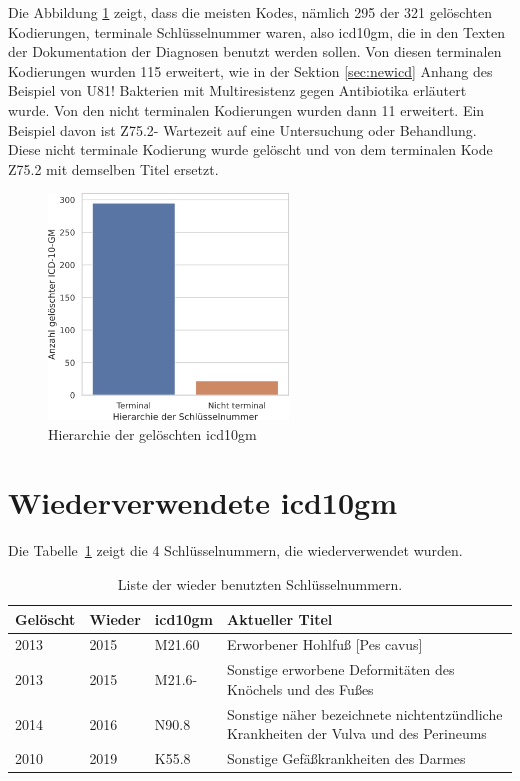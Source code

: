 Die Abbildung \ref{fig:oldicdort} zeigt, dass die meisten Kodes, nämlich 295 der 321 gelöschten Kodierungen, terminale Schlüsselnummer waren, also \ac{icd10gm}, die in den Texten der Dokumentation der Diagnosen benutzt werden sollen. Von diesen terminalen Kodierungen wurden 115 erweitert, wie in der Sektion \ref{sec:newicd} Anhang des Beispiel von \textsf{U81!} \textsf{Bakterien mit Multiresistenz gegen Antibiotika} erläutert wurde. Von den nicht terminalen Kodierungen wurden dann 11 erweitert. Ein Beispiel davon ist \textsf{Z75.2-} \textsf{Wartezeit auf eine Untersuchung oder Behandlung}. Diese nicht terminale Kodierung wurde gelöscht und von dem terminalen Kode \textsf{Z75.2} mit demselben Titel ersetzt. 


\begin{figure}[ht]
	\centering
	\includegraphics[height=6cm]{figures/ortoldYear}
	\caption{Hierarchie der gelöschten \acs{icd10gm}}
	\label{fig:oldicdort}
\end{figure}


\section{Wiederverwendete \acs{icd10gm}} \label{sec:delinicd}

Die Tabelle~\ref{tab:wieder} zeigt die 4 Schlüsselnummern, die wiederverwendet wurden.

\begin{table}[ht]
	\centering
	\small
	\caption[Wieder benutzte \acs{icd10gm}]{Liste der wieder benutzten Schlüsselnummern.}
	\label{tab:wieder}
	\begin{tabular}{|l|l|l|p{6cm}|}
		\hline
		\rowcolor{lightgray} Gelöscht & Wieder & \ac{icd10gm} & Aktueller Titel \\ \hline
		2013 & 2015 & M21.60 & Erworbener Hohlfuß [Pes cavus] \\ \hline
		2013 & 2015 & M21.6- & Sonstige erworbene Deformitäten des Knöchels und des Fußes \\ \hline
		2014 & 2016 & N90.8 & Sonstige näher bezeichnete nichtentzündliche Krankheiten der Vulva und des Perineums \\ \hline
		2010 & 2019 & K55.8 & Sonstige Gefäßkrankheiten des Darmes \\ \hline

\end{tabular}
\end{table}

